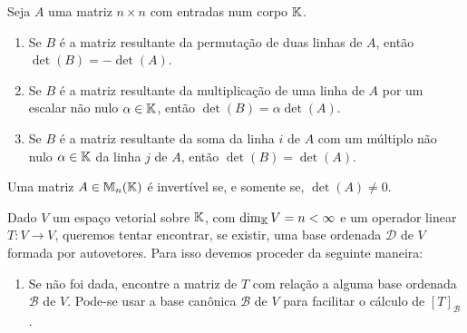 \documentclass{beamer}
\begin{document}
    \begin{frame}
        \begin{proposicao}
            Seja $A$ uma matriz $n \times n$ \pause com entradas num corpo $\mathbb{K}$.\pause
            \begin{enumerate}[label={\roman*})]
                \item Se $B$ é a matriz resultante da permutação de duas linhas de $A$, \pause então $\det (B) = -\det (A)$.\pause


                \vspace*{1cm}

                \item Se $B$ é a matriz resultante da multiplicação de uma linha de $A$ \pause por um escalar não nulo $\alpha \in \mathbb{K}$, \pause então $\det(B) = \alpha\det(A)$.\pause

                \vspace*{1cm}

                \item Se $B$ é a matriz resultante da soma da linha $i$ de $A$ \pause com um múltiplo não nulo \pause $\alpha \in \mathbb{K}$ da linha $j$ de $A$, \pause então $\det(B) = \det(A)$.
            \end{enumerate}
        \end{proposicao}
    \end{frame}

    \begin{frame}
        \begin{teorema}
            Uma matriz $A \in \mathbb{M}_n(\mathbb{K})$ \pause é invertível se, \pause e somente se, $\det(A) \ne 0$.
        \end{teorema}
    \end{frame}

    \begin{frame}
        Dado $V$ um espaço vetorial sobre $\mathbb{K}$, \pause com $\dim_{\mathbb{K}} V = n < \infty$ \pause e um operador linear $T \colon V \to V$, \pause queremos tentar encontrar, se existir, \pause uma base ordenada $\mathcal{D}$ de $V$ \pause formada por autovetores. \pause Para isso devemos proceder da seguinte maneira:\pause
        \begin{enumerate}[label={\arabic*})]
            \item Se não foi dada, \pause encontre a matriz de $T$ com relação a alguma base ordenada $\mathcal{B}$ de $V$. \pause Pode-se usar a base canônica $\mathcal{B}$ \pause de $V$ para facilitar o cálculo de $[T]_\mathcal{B}$.
            \seti
        \end{enumerate}
    \end{frame}
\end{document}
